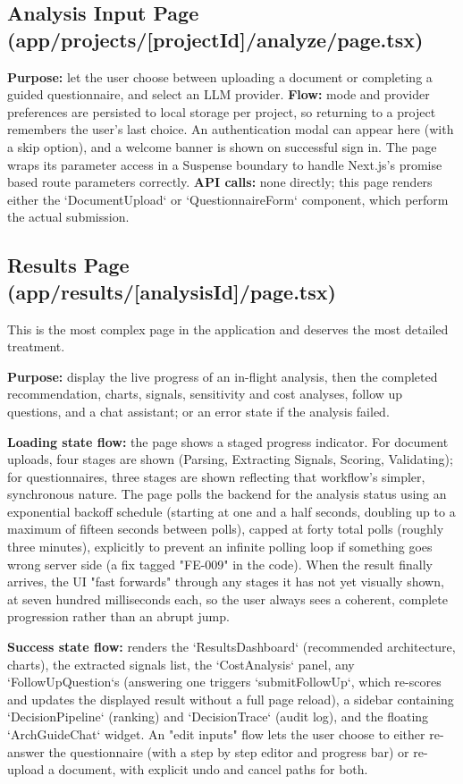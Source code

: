 \documentclass[11pt,a4paper]{report}
\begin{document}
\subsection{Analysis Input Page (app/projects/[projectId]/analyze/page.tsx)}
\textbf{Purpose:} let the user choose between uploading a document or completing a guided questionnaire, and select an LLM provider.
\textbf{Flow:} mode and provider preferences are persisted to local storage per project, so returning to a project remembers the user's last choice. An authentication modal can appear here (with a skip option), and a welcome banner is shown on successful sign in. The page wraps its parameter access in a Suspense boundary to handle Next.js's promise based route parameters correctly.
\textbf{API calls:} none directly; this page renders either the `DocumentUpload` or `QuestionnaireForm` component, which perform the actual submission.

\subsection{Results Page (app/results/[analysisId]/page.tsx)}
This is the most complex page in the application and deserves the most detailed treatment.

\textbf{Purpose:} display the live progress of an in-flight analysis, then the completed recommendation, charts, signals, sensitivity and cost analyses, follow up questions, and a chat assistant; or an error state if the analysis failed.

\textbf{Loading state flow:} the page shows a staged progress indicator. For document uploads, four stages are shown (Parsing, Extracting Signals, Scoring, Validating); for questionnaires, three stages are shown reflecting that workflow's simpler, synchronous nature. The page polls the backend for the analysis status using an exponential backoff schedule (starting at one and a half seconds, doubling up to a maximum of fifteen seconds between polls), capped at forty total polls (roughly three minutes), explicitly to prevent an infinite polling loop if something goes wrong server side (a fix tagged "FE-009" in the code). When the result finally arrives, the UI "fast forwards" through any stages it has not yet visually shown, at seven hundred milliseconds each, so the user always sees a coherent, complete progression rather than an abrupt jump.

\textbf{Success state flow:} renders the `ResultsDashboard` (recommended architecture, charts), the extracted signals list, the `CostAnalysis` panel, any `FollowUpQuestion`s (answering one triggers `submitFollowUp`, which re-scores and updates the displayed result without a full page reload), a sidebar containing `DecisionPipeline` (ranking) and `DecisionTrace` (audit log), and the floating `ArchGuideChat` widget. An "edit inputs" flow lets the user choose to either re-answer the questionnaire (with a step by step editor and progress bar) or re-upload a document, with explicit undo and cancel paths for both.
\end{document}

